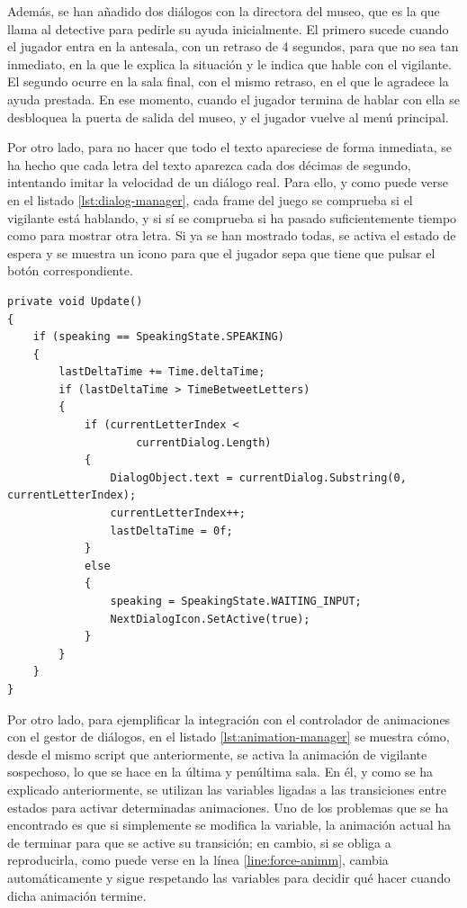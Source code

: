 Además, se han añadido dos diálogos con la directora del museo, que es la que llama al detective para pedirle su ayuda inicialmente. El primero sucede cuando el jugador entra en la antesala, con un retraso de 4 segundos, para que no sea tan inmediato, en la que le explica la situación y le indica que hable con el vigilante. El segundo ocurre en la sala final, con el mismo retraso, en el que le agradece la ayuda prestada. En ese momento, cuando el jugador termina de hablar con ella se desbloquea la puerta de salida del museo, y el jugador vuelve al menú principal.

Por otro lado, para no hacer que todo el texto apareciese de forma inmediata, se ha hecho que cada letra del texto aparezca cada dos décimas de segundo, intentando imitar la velocidad de un diálogo real. Para ello, y como puede verse en el listado \ref{lst:dialog-manager}, cada frame del juego se comprueba si el vigilante está hablando, y si sí se comprueba si ha pasado suficientemente tiempo como para mostrar otra letra. Si ya se han mostrado todas, se activa el estado de espera y se muestra un icono para que el jugador sepa que tiene que pulsar el botón correspondiente.

\begin{lstlisting}[caption=Fragmento del script del gestor de diálogos, label=lst:dialog-manager]
private void Update()
{
    if (speaking == SpeakingState.SPEAKING)
    {
        lastDeltaTime += Time.deltaTime;
        if (lastDeltaTime > TimeBetweetLetters)
        {
            if (currentLetterIndex < 
                    currentDialog.Length)
            {
                DialogObject.text = currentDialog.Substring(0, currentLetterIndex);
                currentLetterIndex++;
                lastDeltaTime = 0f;
            }
            else
            {
                speaking = SpeakingState.WAITING_INPUT;
                NextDialogIcon.SetActive(true);
            }
        }
    }
}
\end{lstlisting}

Por otro lado, para ejemplificar la integración con el controlador de animaciones con el gestor de diálogos, en el listado \ref{lst:animation-manager} se muestra cómo, desde el mismo script que anteriormente, se activa la animación de vigilante sospechoso, lo que se hace en la última y penúltima sala. En él, y como se ha explicado anteriormente, se utilizan las variables ligadas a las transiciones entre estados para activar determinadas animaciones. Uno de los problemas que se ha encontrado es que si simplemente se modifica la variable, la animación actual ha de terminar para que se active su transición; en cambio, si se obliga a reproducirla, como puede verse en la línea \ref{line:force-animm}, cambia automáticamente y sigue respetando las variables para decidir qué hacer cuando dicha animación termine.

